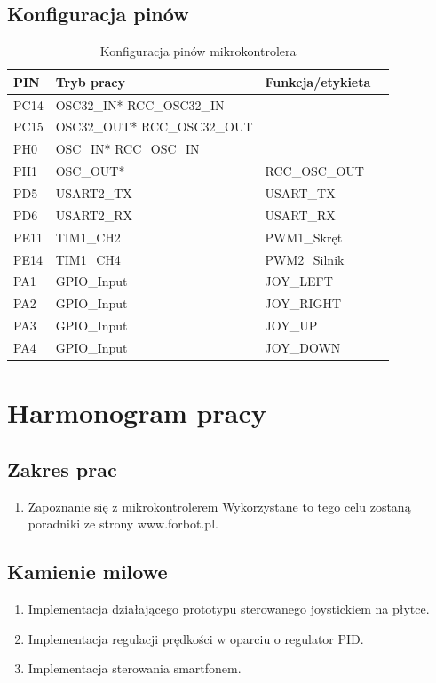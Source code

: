 \documentclass[10pt, a4paper]{article}
\begin{document}
\subsection{Konfiguracja pinów}

\begin{table}[H]
	\centering
	\begin{tabular}{|l|l|l|l|}
		\hline
		PIN & Tryb pracy & Funkcja/etykieta\\
		\hline
			PC14 & OSC32\_IN*	RCC\_OSC32\_IN	&\\
			PC15 & OSC32\_OUT*	RCC\_OSC32\_OUT	&\\
			PH0&  OSC\_IN*	RCC\_OSC\_IN	&\\
			PH1&  OSC\_OUT*&		RCC\_OSC\_OUT	\\
			PD5&	USART2\_TX&	USART\_TX\\
			PD6&	USART2\_RX&	USART\_RX\\
			PE11&	TIM1\_CH2&	PWM1\_Skręt\\
			PE14&	TIM1\_CH4&	PWM2\_Silnik\\
			PA1&	GPIO\_Input&	JOY\_LEFT\\
			PA2&	GPIO\_Input&	JOY\_RIGHT\\
			PA3&	GPIO\_Input&	JOY\_UP\\
			PA4&	GPIO\_Input&	JOY\_DOWN\\


		\hline
	\end{tabular}
	\caption{Konfiguracja pinów mikrokontrolera}
	
\end{table}


\section{Harmonogram pracy}

\subsection{Zakres prac}
	\begin{enumerate}
		\item Zapoznanie się z mikrokontrolerem
		\newline
		Wykorzystane to tego celu zostaną poradniki ze strony www.forbot.pl. \cite{kurs1, kurs2, kurs3}
	\end{enumerate}
\subsection{Kamienie milowe}
	\begin{enumerate}
		\item Implementacja działającego prototypu sterowanego joystickiem na płytce.
		\item Implementacja regulacji prędkości w oparciu o regulator PID.
		\item Implementacja sterowania smartfonem.
	\end{enumerate}
\end{document}
